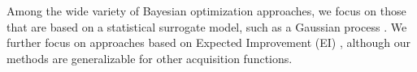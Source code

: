 \documentclass[AMA,Times1COL]{WileyNJDv5} %
\begin{document}
%
Among the wide variety of Bayesian optimization approaches, we focus on those
that are based on a statistical surrogate model, such as a Gaussian process
\citep{santnerBook}. We further focus on approaches based on Expected
Improvement (EI) \citep{gBook}, although our methods are generalizable for other
acquisition functions.

%
%

\end{document}
